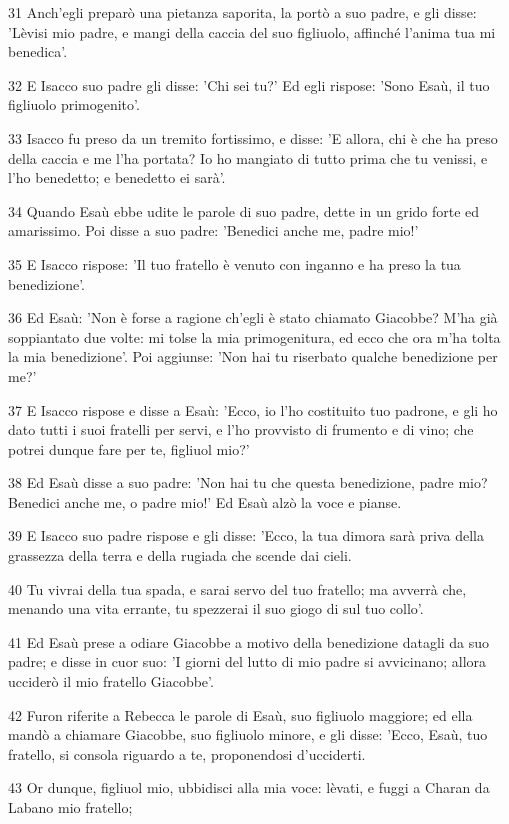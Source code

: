 \par 31 Anch'egli preparò una pietanza saporita, la portò a suo padre, e gli disse: 'Lèvisi mio padre, e mangi della caccia del suo figliuolo, affinché l'anima tua mi benedica'.
\par 32 E Isacco suo padre gli disse: 'Chi sei tu?' Ed egli rispose: 'Sono Esaù, il tuo figliuolo primogenito'.
\par 33 Isacco fu preso da un tremito fortissimo, e disse: 'E allora, chi è che ha preso della caccia e me l'ha portata? Io ho mangiato di tutto prima che tu venissi, e l'ho benedetto; e benedetto ei sarà'.
\par 34 Quando Esaù ebbe udite le parole di suo padre, dette in un grido forte ed amarissimo. Poi disse a suo padre: 'Benedici anche me, padre mio!'
\par 35 E Isacco rispose: 'Il tuo fratello è venuto con inganno e ha preso la tua benedizione'.
\par 36 Ed Esaù: 'Non è forse a ragione ch'egli è stato chiamato Giacobbe? M'ha già soppiantato due volte: mi tolse la mia primogenitura, ed ecco che ora m'ha tolta la mia benedizione'. Poi aggiunse: 'Non hai tu riserbato qualche benedizione per me?'
\par 37 E Isacco rispose e disse a Esaù: 'Ecco, io l'ho costituito tuo padrone, e gli ho dato tutti i suoi fratelli per servi, e l'ho provvisto di frumento e di vino; che potrei dunque fare per te, figliuol mio?'
\par 38 Ed Esaù disse a suo padre: 'Non hai tu che questa benedizione, padre mio? Benedici anche me, o padre mio!' Ed Esaù alzò la voce e pianse.
\par 39 E Isacco suo padre rispose e gli disse: 'Ecco, la tua dimora sarà priva della grassezza della terra e della rugiada che scende dai cieli.
\par 40 Tu vivrai della tua spada, e sarai servo del tuo fratello; ma avverrà che, menando una vita errante, tu spezzerai il suo giogo di sul tuo collo'.
\par 41 Ed Esaù prese a odiare Giacobbe a motivo della benedizione datagli da suo padre; e disse in cuor suo: 'I giorni del lutto di mio padre si avvicinano; allora ucciderò il mio fratello Giacobbe'.
\par 42 Furon riferite a Rebecca le parole di Esaù, suo figliuolo maggiore; ed ella mandò a chiamare Giacobbe, suo figliuolo minore, e gli disse: 'Ecco, Esaù, tuo fratello, si consola riguardo a te, proponendosi d'ucciderti.
\par 43 Or dunque, figliuol mio, ubbidisci alla mia voce: lèvati, e fuggi a Charan da Labano mio fratello;
